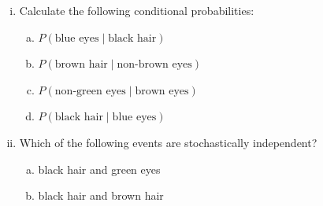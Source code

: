 \documentclass[nobib,nofonts]{tufte-handout}
\begin{document}
{\begin{minipage}{1.0\textwidth}
\begin{exercise}
\begin{enumerate}[(i)]
      \item Calculate the following conditional probabilities:

      \begin{enumerate}[a.]
        \item $P(\text{blue eyes} \mid \text{black hair})$
        \item $P(\text{brown hair} \mid \text{non-brown eyes})$
        \item $P(\text{non-green eyes} \mid \text{brown eyes})$
        \item $P(\text{black hair} \mid \text{blue eyes})$
      \end{enumerate}

      \item Which of the following events are stochastically independent?

      \begin{enumerate}[a.]
        \item black hair and green eyes
        \item black hair and brown hair
      \end{enumerate}

    \end{enumerate}
    \end{exercise}



  \end{minipage}
}
\end{document}
